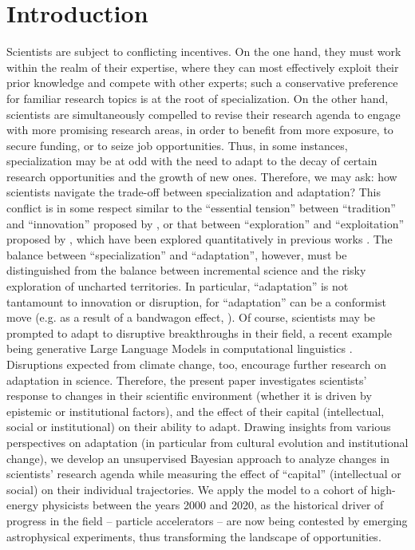 \documentclass{article}
\begin{document}
\section{Introduction}

Scientists are subject to conflicting incentives. On the one hand, they must work within the realm of their expertise, where they can most effectively exploit their prior knowledge and compete with other experts; such a conservative preference for familiar research topics is at the root of specialization. On the other hand, scientists are simultaneously compelled to revise their research agenda to engage with more promising research areas, in order to benefit from more exposure, to secure funding, or to seize job opportunities. Thus, in some instances, specialization may be at odd with the need to adapt to the decay of certain research opportunities and the growth of new ones. Therefore, we may ask: how scientists navigate the trade-off between specialization and adaptation? This conflict is in some respect similar to the ``essential tension'' between ``tradition'' and ``innovation'' proposed by \citet{Kuhn1997}, or that between ``exploration'' and ``exploitation'' proposed by \citet{March1991}, which have been explored quantitatively in previous works \citep{Foster2015,Jia2017,Aleta2019,Zeng2019,Tripodi2020,Chakresh2023,Feifan2023}%
. The balance between ``specialization'' and ``adaptation'', however, must be distinguished from the balance between incremental science and the risky exploration of uncharted territories. In particular, ``adaptation'' is not tantamount to innovation or disruption, for ``adaptation'' can be a conformist move (e.g. as a result of a bandwagon effect, \citealt{Fujimura1988}). Of course, scientists may be prompted to adapt to disruptive breakthroughs in their field, a recent example being generative Large Language Models in computational linguistics \citep{Naomi2023}. Disruptions expected from climate change, too, encourage further research on adaptation in science. Therefore, the present paper investigates scientists' response to changes in their scientific environment (whether it is driven by epistemic or institutional factors), and the effect of their capital (intellectual, social or institutional) on their ability to adapt. Drawing insights from various perspectives on adaptation (in particular from cultural evolution and institutional change), we develop an unsupervised Bayesian approach to analyze changes in scientists' research agenda while measuring the effect of ``capital'' (intellectual or social) on their individual trajectories. We apply the model to a cohort of high-energy physicists between the years 2000 and 2020, as the historical driver of progress in the field -- particle accelerators -- are now being contested by emerging astrophysical experiments, thus transforming the landscape of opportunities. %
\end{document}
